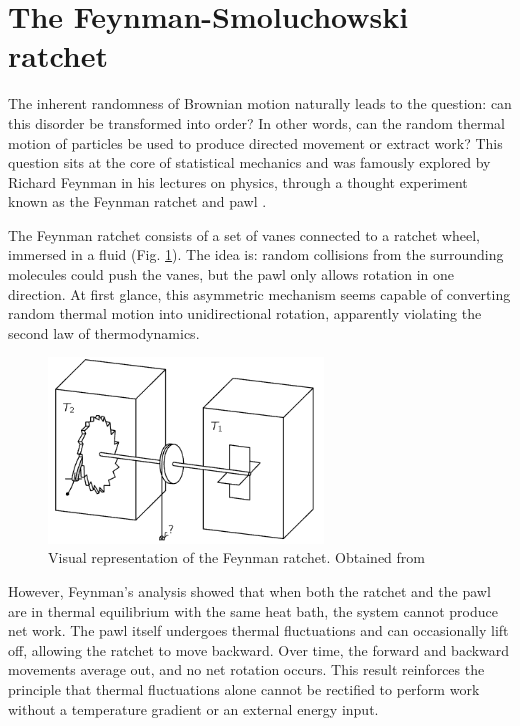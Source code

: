\section{The Feynman-Smoluchowski ratchet}

The inherent randomness of Brownian motion naturally leads to the question: can this disorder be transformed into order? In other words, can the random thermal motion of particles be used to produce directed movement or extract work? This question sits at the core of statistical mechanics and was famously explored by Richard Feynman in his lectures on physics, through a thought experiment known as the Feynman ratchet and pawl \cite{feynman1963feynman}.

The Feynman ratchet consists of a set of vanes connected to a ratchet wheel, immersed in a fluid (Fig. \ref{fig:feynmanratchet}). The idea is: random collisions from the surrounding molecules could push the vanes, but the pawl only allows rotation in one direction. At first glance, this asymmetric mechanism seems capable of converting random thermal motion into unidirectional rotation, apparently violating the second law of thermodynamics.

\begin{figure}
  \begin{center}
    \includegraphics[width=0.65\textwidth]{figures/feynmanratchet.png}
  \end{center}
  \caption[Feynman ratchet]{Visual representation of the Feynman ratchet. Obtained from \cite{feynman1963feynman}}\label{fig:feynmanratchet}
\end{figure}


However, Feynman's analysis showed that when both the ratchet and the pawl are in thermal equilibrium with the same heat bath, the system cannot produce net work. The pawl itself undergoes thermal fluctuations and can occasionally lift off, allowing the ratchet to move backward. Over time, the forward and backward movements average out, and no net rotation occurs. This result reinforces the principle that thermal fluctuations alone cannot be rectified to perform work without a temperature gradient or an external energy input.

